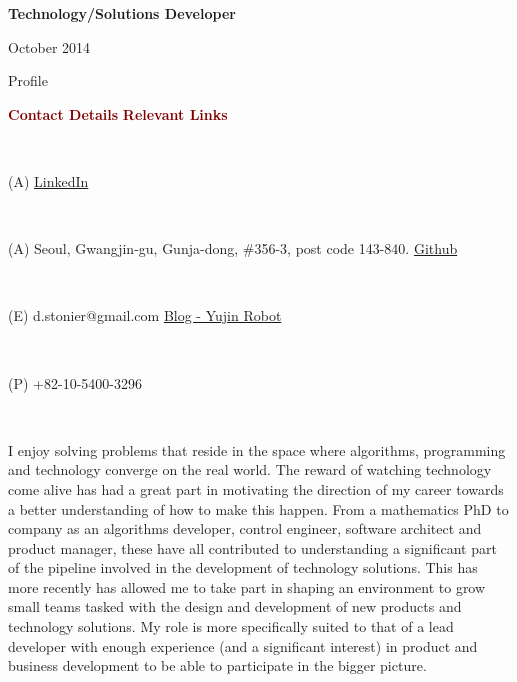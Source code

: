 \documentclass[a4paper,10pt]{article}
\begin{document}

\vspace{-2.5em}

\begin{center}
  \textbf{Technology/Solutions Developer} \\
  \begin{small} October 2014 \end{small}
\end{center}


\vspace{-2.5em}

\begin{cvsection}{Profile}

\vspace{-2em}

\kofamily

\begin{small} \textcolor{maroon}{\textbf{Contact Details}} \hfill \textcolor{maroon}{\textbf{Relevant Links}} \end{small}  \\ 
\begin{small} (A)  \hfill \href{http://kr.linkedin.com/pub/daniel-stonier/22/375/95b}{LinkedIn}  \end{small}  \\ 
\begin{small} (A) Seoul, Gwangjin-gu, Gunja-dong, \#356-3, post code 143-840. \hfill \href{https://github.com/stonier}{Github} \end{small} \\  
\begin{small} (E) d.stonier@gmail.com \hfill \href{http://blog.yujinrobot.com/}{Blog - Yujin Robot} \end{small} \\
\begin{small} (P) +82-10-5400-3296 \hfill \end{small} \\

\rmfamily

  \vspace{-1.5em}

  I enjoy solving problems that reside in the space where algorithms, programming and technology converge on the real world. The reward of watching technology come alive has had a great part in motivating the direction of my career towards a better understanding of how to make this happen. From a mathematics PhD to company as an algorithms developer, control engineer, software architect and product manager, these have all contributed to understanding a significant part of the pipeline involved in the development of technology solutions. This has more recently has allowed me to take part in shaping an environment to grow small teams tasked with the design and development of new products and technology solutions. My role is more specifically suited to that of a lead developer with enough experience (and a significant interest) in product and business development to be able to participate in the bigger picture.
  
\end{cvsection}
\end{document}

